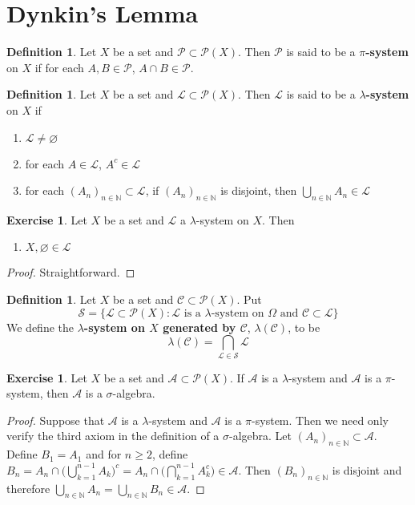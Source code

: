 \documentclass{book}
\theoremstyle{definition}
\newtheorem{defn}[definition]{Definition}
\newtheorem{ex}[definition]{Exercise}
\newcommand{\lam}{\lambda}
\newcommand{\sig}{\sigma}
\newcommand{\Om}{\Omega}
\newcommand{\N}{\mathbb{N}}
\newcommand{\MA}{\mathcal{A}}
\newcommand{\MC}{\mathcal{C}}
\newcommand{\ML}{\mathcal{L}}
\newcommand{\MP}{\mathcal{P}}
\newcommand{\MS}{\mathcal{S}}
\DeclareMathOperator*{\0}{\mbf{0}}
\DeclareMathOperator*{\1}{\mbf{1}}
\begin{document}
	
	\newpage
	\section{Dynkin's Lemma}
	\begin{defn}
		Let $X$ be a set and $\MP \subset \MP(X)$. Then $\MP$ is said to be a \textbf{$\pi$-system} on $X$ if for each $A,B \in \MP$, $A \cap B \in \MP$.
	\end{defn}
	
	\begin{defn}
		Let $X$ be a set and $\ML \subset \MP(X)$. Then $\ML$ is said to be a \textbf{$\lam$-system} on $X$ if 
		\begin{enumerate}
			\item $\ML \neq \varnothing$
			\item for each $A \in \ML$, $A^c \in \ML$
			\item for each $(A_n)_{n \in \N} \subset \ML$, if $(A_n)_{n \in \N}$ is disjoint, then $\bigcup\limits_{n \in \N}A_n \in \ML$
		\end{enumerate}
	\end{defn}
	
	\begin{ex}
		Let $X$ be a set and $\ML$ a $\lam$-system on $X$. Then 
		\begin{enumerate}
			\item $X, \varnothing \in \ML$
		\end{enumerate} 
	\end{ex}
	
	\begin{proof}
		Straightforward.
	\end{proof}
	
	\begin{defn}
		Let $X$ be a set and $\MC \subset \MP(X)$. Put $$\MS = \{\ML \subset \MP(X): \ML \text{ is a }\lam\text{-system on }\Om \text{ and } \MC \subset \ML\}$$ We define the \textbf{$\lam$-system on $X$ generated by $\MC$}, $\lam(\MC)$, to be $$\lam(\MC) = \bigcap_{\ML \in \MS}\ML$$
	\end{defn}
	
	\begin{ex}
		Let $X$ be a set and $\MA \subset \MP(X)$. If $\MA$ is a $\lam$-system and $\MA$ is a $\pi$-system, then $\MA$ is a $\sig$-algebra.
	\end{ex}
	
	\begin{proof}
		Suppose that $\MA$ is a $\lam$-system and $\MA$ is a $\pi$-system. Then we need only verify the third axiom in the definition of a $\sig$-algebra. Let $(A_n)_{n \in \N} \subset \MA$. Define $B_1 = A_1$ and for $n \geq 2$, define $B_n = A_n \cap \bigg( \bigcup\limits_{k=1}^{n-1}A_k \bigg)^c = A_n \cap \bigg( \bigcap\limits_{k=1}^{n-1}A_k^c \bigg) \in \MA$. Then $(B_n)_{n \in \N}$ is disjoint and therefore $\bigcup\limits_{n \in \N}A_n = \bigcup\limits_{n \in \N}B_n \in \MA$.
	\end{proof}
	
\end{document}

